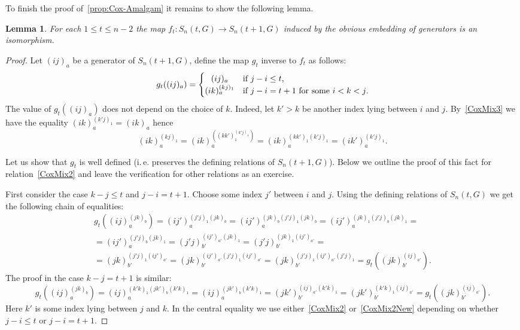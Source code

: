 \documentclass[oneside, 10pt]{amsart}
\theoremstyle{plain}
\numberwithin{equation}{section}
\newtheorem{lemma}{Lemma}
\numberwithin{lemma}{section}
\theoremstyle{remark}
\theoremstyle{definition}
\begin{document}
To finish the proof of~\cref{prop:Cox-Amalgam} it remains to show the following lemma.
\begin{lemma} \label{lem:coxeter-amalgam}
For each $1 \leq t \leq n-2$ the map $f_t \colon S_n(t, G)\to S_n(t+1, G)$ induced by the obvious embedding of generators is an isomorphism.
\end{lemma}
\begin{proof}
Let $(ij)_a$ be a generator of $S_n(t+1, G)$, define the map $g_t$ inverse to $f_t$ as follows:
\[g_t((ij)_a) = \left\{\def\arraystretch{1.2}%
  \begin{array}{@{}c@{\quad}l@{}}
    (ij)_a & \text{if $j-i\leq t$,}\\
    (ik)_{a}^{(kj)_1} & \text{if $j-i=t+1$ for some $i<k<j$.}\\
  \end{array}\right.\]
The value of $g_t((ij)_a)$ does not depend on the choice of $k$.
Indeed, let $k'> k$ be another index lying between $i$ and $j$. 
By~\eqref{CoxMix3} we have the equality $(ik)_a^{(k'j)_1} = (ik)_a$ hence
\[(ik)_a ^{(kj)_1} = (ik)_a ^{\left((kk')_1 ^{(k'j)_1}\right)} = (ik)_a^{(kk')_{1} (k'j)_{1}} = (ik')_a ^{(k'j)_1}.\]

Let us show that $g_t$ is well defined (i.\,e. preserves the defining relations of $S_n(t+1, G)$).
Below we outline the proof of this fact for relation~\eqref{CoxMix2} and leave the verification for other relations as an exercise.

First consider the case $k-j\leq t$ and $j-i=t+1$. Choose some index $j'$ between $i$ and $j$.
Using the defining relations of $S_n(t,G)$ we get the following chain of equalities:
\begin{multline}\label{CoxMix2New} g_t((ij)_a^{(jk)_b}) = (ij')_{a} ^ {(j'j)_1 (jk)_b} = (ij')_a ^{ (jk)_b (j'j)_1 (jk)_b } = 
(ij')_a ^{(jk)_1 (j'j)_b (jk)_1} = \\ = (ij')_a ^{(j'j)_b (jk)_1} = (j'j)_{b'}^ {(ij')_{a'} (jk)_1} = 
 (j'j)_{b'}^ {(jk)_1 (ij')_{a'}} = \\ = (jk)_{b'}^{(j'j)_1 (ij')_{a'}} = (jk)_{b'}^{(ij')_{a'} (j'j)_1 (ij')_{a'}}
 = (jk)_{b'}^{(j'j)_1 (ij')_{a'} (j'j)_1} = g_t((jk)_{b'}^{(ij)_{a'}}). \end{multline}
The proof in the case $k-j = t+1$ is similar:
\[g_t((ij)_a^{(jk)_b}) = (ij)_a ^ {(k'k)_1 (jk')_b (k'k)_1} = (ij)_a ^ {(jk')_b (k'k)_1} =
(jk')_{b'} ^ {(ij)_{a'} (k'k)_1} = (jk')_{b'} ^ {(k'k)_1 (ij)_{a'}} = g_t((jk)_{b'}^{(ij)_{a'}}).\]
Here $k'$ is some index lying between $j$ and $k$.
In the central equality we use either~\eqref{CoxMix2} or~\eqref{CoxMix2New} depending on whether $j-i\leq t$ or $j-i=t+1$.
\end{proof} 
\end{document}
